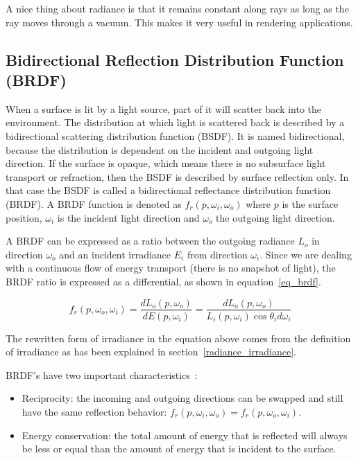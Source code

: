 \documentclass[11pt,a4paper]{report}
\begin{document}
A nice thing about radiance is that it remains constant along rays as long as the ray moves through a vacuum. This makes it very useful in rendering applications.

\subsection{Bidirectional Reflection Distribution Function (BRDF)}

When a surface is lit by a light source, part of it will scatter back into the environment. The distribution at which light is scattered back is described by a bidirectional scattering distribution function (BSDF). It is named bidirectional, because the distribution is dependent on the incident and outgoing light direction. If the surface is opaque, which means there is no subsurface light transport or refraction, then the BSDF is described by surface reflection only. In that case the BSDF is called a bidirectional reflectance distribution function (BRDF). A BRDF function is denoted as $f_r(p, \omega_i, \omega_o)$ where $p$ is the surface position, $\omega_i$ is the incident light direction and $\omega_o$ the outgoing light direction.

A BRDF can be expressed as a ratio between the outgoing radiance $L_o$ in direction $\omega_o$ and an incident irradiance $E_i$ from direction $\omega_i$. Since we are dealing with a continuous flow of energy transport (there is no snapshot of light), the BRDF ratio is expressed as a differential, as shown in equation~\ref{eq_brdf}.

\begin{equation}
f_r(p, \omega_o, \omega_i) = \frac{dL_o(p, \omega_o)}{dE(p,\omega_i)} = \frac{dL_o(p, \omega_o)}{L_i(p, \omega_i) \cos \theta_i d\omega_i}
\label{eq_brdf}
\end{equation}

The rewritten form of irradiance in the equation above comes from the definition of irradiance as has been explained in section~\ref{radiance_irradiance}.

BRDF's have two important characteristics~\cite{pharr2017}:

\begin{itemize}
\item Reciprocity: the incoming and outgoing directions can be swapped and still have the same reflection behavior: $f_r(p, \omega_i, \omega_o) = f_r(p, \omega_o, \omega_i)$.
\item Energy conservation: the total amount of energy that is reflected will always be less or equal than the amount of energy that is incident to the surface.
\end{itemize}
\end{document}

